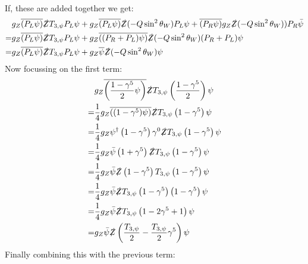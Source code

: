 \documentclass[12pt,a4]{article}
\begin{document}
\begin{enumerate}
\begin{enumerate}
\begin{align*}
        \end{align*}
        If, these are added together we get:
        \begin{align*}
                          & g_Z \overline{\left(P_L \psi\right)} \slashed{Z}  T_{3, \psi} P_L\psi + g_Z \overline{\left(P_L \psi\right)} \slashed{Z}( - Q \sin^2 \theta_W )P_L\psi + \overline{\left(P_R \psi\right)}  g_Z \slashed{Z} (-Q \sin^2\theta_W) ) P_R\bar{\psi}\\
          =               & g_Z \overline{\left(P_L \psi\right)} \slashed{Z}  T_{3, \psi} P_L\psi + g_Z \overline{\left((P_R + P_L) \psi\right)} \slashed{Z}( - Q \sin^2 \theta_W )(P_R + P_L)\psi \\
          =               & g_Z \overline{\left(P_L \psi\right)} \slashed{Z}  T_{3, \psi} P_L\psi + g_Z \overline{\psi} \slashed{Z}( - Q \sin^2 \theta_W ) \psi 
        \end{align*}
        Now focussing on the first term:
        \begin{align*}
                          & g_Z \overline{\left(\frac{1 - \gamma^5}{2} \psi\right)} \slashed{Z}  T_{3, \psi} \left(\frac{1 - \gamma^5}{2}\right)\psi \\
          =               & \frac{1}{4} g_Z \overline{\left((1 - \gamma^5 )\psi\right)} \slashed{Z}  T_{3, \psi} \left(1 - \gamma^5\right)\psi \\
          =               & \frac{1}{4} g_Z \psi^\dagger\left(1 - \gamma^5 \right)\gamma^0 \slashed{Z}  T_{3, \psi} \left(1 - \gamma^5\right)\psi \\
          =               & \frac{1}{4} g_Z \bar{\psi}\left(1 + \gamma^5 \right) \slashed{Z}  T_{3, \psi} \left(1 - \gamma^5\right)\psi \\
          =               & \frac{1}{4} g_Z \bar{\psi} \slashed{Z} \left(1 - \gamma^5 \right) T_{3, \psi} \left(1 - \gamma^5\right)\psi \\
          =               & \frac{1}{4} g_Z \bar{\psi} \slashed{Z}  T_{3, \psi} \left(1 - \gamma^5 \right) \left(1 - \gamma^5\right)\psi \\
          =               & \frac{1}{4} g_Z \bar{\psi} \slashed{Z}  T_{3, \psi} \left(1 - 2 \gamma^5  + 1\right) \psi \\
          =               & g_Z \bar{\psi} \slashed{Z}  \left(\frac{T_{3, \psi}}{2}  -  \frac{T_{3, \psi}}{2} \gamma^5 \right) \psi 
        \end{align*}
        Finally combining this with the previous term:
        \begin{align*}

\end{align*}
\end{enumerate}
\end{enumerate}
\end{document}
